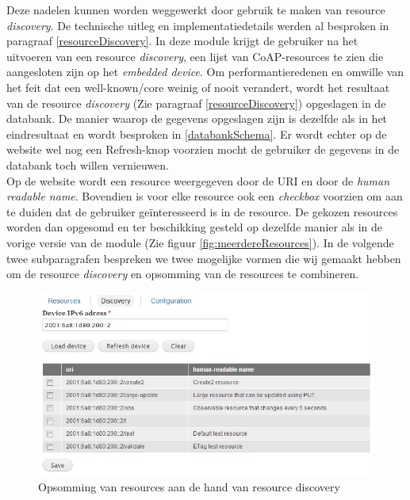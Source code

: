 Deze nadelen kunnen worden weggewerkt door gebruik te maken van resource \textit{discovery}. De technische uitleg en implementatiedetails werden al besproken in paragraaf \ref{resourceDiscovery}. In deze module krijgt de gebruiker na het uitvoeren van een resource \textit{discovery}, een lijst van CoAP-resources te zien die aangesloten zijn op het \textit{embedded device}. Om performantieredenen en omwille van het feit dat een well-known/core weinig of nooit verandert, wordt het resultaat van de resource \textit{discovery} (Zie paragraaf \ref{resourceDiscovery}) opgeslagen in de databank. De manier waarop de gegevens opgeslagen zijn is dezelfde als in het eindresultaat en wordt besproken in \ref{databankSchema}. Er wordt echter op de website wel nog een Refresh-knop voorzien mocht de gebruiker de gegevens in de databank toch willen vernieuwen.\\
Op de website wordt een resource weergegeven door de URI en door de \textit{human readable name}. Bovendien is voor elke resource ook een \textit{checkbox} voorzien om aan te duiden dat de gebruiker ge\"{i}nteresseerd is in de resource. De gekozen resources worden dan opgesomd en ter beschikking gesteld op dezelfde manier als in de vorige versie van de module (Zie figuur \ref{fig:meerdereResources}). In de volgende twee subparagrafen bespreken we twee mogelijke vormen die wij gemaakt hebben om de resource \textit{discovery} en opsomming van de resources te combineren.

\begin{figure}[h!]
\centering
\includegraphics[width=1\textwidth]{fig/tabbladen}
\caption{Opsomming van resources aan de hand van resource discovery}
\label{fig:tabbladen}
\end{figure}

